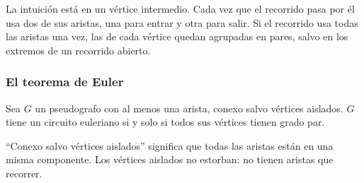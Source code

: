 \documentclass[11pt,letterpaper]{article}
\begin{document}
La intuición está en un vértice intermedio. Cada vez que el recorrido
pasa por él usa dos de sus aristas, una para entrar y otra para salir.
Si el recorrido usa todas las aristas una vez, las de cada vértice
quedan agrupadas en pares, salvo en los extremos de un recorrido
abierto.

\subsubsection*{El teorema de Euler}

\begin{teorema}[Euler]
  \label{teo:euler-circuito}
  Sea $G$ un pseudografo con al menos una arista, conexo salvo vértices
  aislados. $G$ tiene un circuito euleriano si y solo si todos sus
  vértices tienen grado par.
\end{teorema}

``Conexo salvo vértices aislados'' significa que todas las aristas
están en una misma componente. Los vértices aislados no estorban: no
tienen aristas que recorrer.
\end{document}
